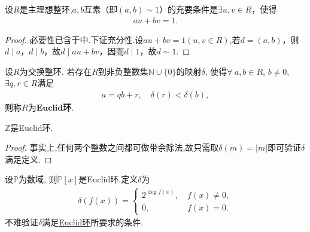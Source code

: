 \documentclass[../../main.tex]{subfiles}%
\begin{document}
\begin{corollary}\label{corollary:主理想整环中互素的充要条件}
设$R$是主理想整环,$a, b$互素（即$(a, b) \sim 1$）的充要条件是$\exists u, v \in R$，使得
\begin{align*}
au + bv = 1. 
\end{align*}
\end{corollary}
\begin{proof}

必要性已含于中.下证充分性.设$au + bv = 1(u,v\in R)$,若$d = (a, b)$，则$d \mid a$，$d \mid b$，故$d \mid au + bv$，因而$d \mid 1$，故$d \sim 1$.

\end{proof}

\begin{definition}[Euclid环]\label{definition:Euclid环的定义}
设$R$为交换整环. 若存在$R$到非负整数集$\mathbb{N}\cup\{0\}$的映射$\delta$, 使得$\forall\ a,b\in R$, $b\neq 0$, $\exists q,r\in R$满足
\begin{align}\label{eq:::09gj3ety4s34wygew3tygwef23g2.5.3}
a=qb+r,\quad \delta(r)<\delta(b),
\end{align}
则称$R$为$\mathbf{Euclid}$\textbf{环}.
\end{definition}

\begin{example}
$\mathbb{Z}$是Euclid环.
\end{example}
\begin{proof}

事实上,任何两个整数之间都可做带余除法,故只需取$\delta(m)=|m|$即可验证$\delta$满足定义.

\end{proof}

\begin{example}
设$\mathbb{P}$为数域, 则$\mathbb{P}[x]$是Euclid环.定义$\delta$为
\begin{align*}
\delta(f(x))=
\begin{cases}
2^{\deg f(x)},\ &f(x)\neq 0,\\
0,\ &f(x)=0.
\end{cases}
\end{align*}
不难验证$\delta$满足\hyperref[definition:Euclid环的定义]{Euclid环}所要求的条件.
\end{example}
\end{document}
